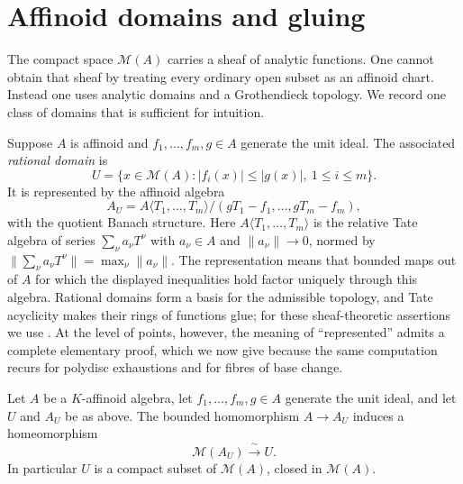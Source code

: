 \section{Affinoid domains and gluing}
\label{sec:berk-affinoid-gluing}

The compact space $\mathcal M(A)$ carries a sheaf of analytic functions.
One cannot obtain that sheaf by treating every ordinary open subset as an
affinoid chart. Instead one uses analytic domains and a Grothendieck
topology. We record one class of domains that is sufficient for intuition.

Suppose $A$ is affinoid and $f_1,\ldots,f_m,g\in A$ generate the unit
ideal. The associated \emph{rational domain} is
\[
 U=\{x\in\mathcal M(A): |f_i(x)|\leq |g(x)|,\ 1\leq i\leq m\}.
\]
It is represented by the affinoid algebra
\[
 A_U=A\langle T_1,\ldots,T_m\rangle/(gT_1-f_1,\ldots,gT_m-f_m),
\]
with the quotient Banach structure. Here
$A\langle T_1,\ldots,T_m\rangle$ is the relative Tate
algebra of series $\sum_\nu a_\nu T^\nu$ with
$a_\nu\in A$ and $\|a_\nu\|\to0$, normed by
$\|\sum_\nu a_\nu T^\nu\|=\max_\nu\|a_\nu\|$.  The representation means
that bounded maps out of $A$ for which the displayed inequalities hold
factor uniquely through this algebra. Rational domains form a basis for the
admissible topology, and Tate acyclicity makes their rings of functions
glue; for these sheaf-theoretic assertions we use
\cite[\S2.2]{Berk12}.  At the level of
points, however, the meaning of ``represented'' admits a complete
elementary proof, which we now give because the same computation recurs
for polydisc exhaustions and for fibres of base change.

\begin{proposition}
\label{prop:berk-rational-domain}
Let $A$ be a $K$-affinoid algebra, let $f_1,\ldots,f_m,g\in A$
generate the unit ideal, and let $U$ and $A_U$ be as above. The
bounded homomorphism $A\to A_U$ induces a homeomorphism
\[
             \mathcal M(A_U)\xrightarrow{\ \sim\ }U.
\]
In particular $U$ is a compact subset of $\mathcal M(A)$, closed in
$\mathcal M(A)$.
\end{proposition}

